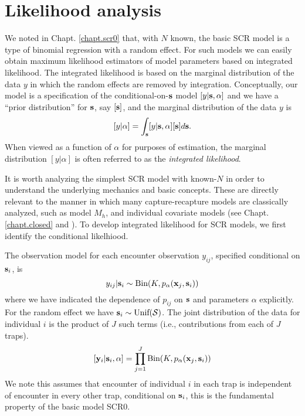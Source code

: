 \section{Likelihood analysis }

We noted in Chapt. \ref{chapt.scr0} that, with $N$ known, the basic SCR model is a
type of binomial regression with a random effect. For such models we
can easily obtain maximum likelihood estimators of model parameters
based on integrated likelihood. The integrated likelihood is based on
the marginal distribution of the data $y$ in which the random effects
are removed by integration. Conceptually, our model is a specification
of the conditional-on-${\bf s}$ model $[y|{\bf s},\alpha]$ and we have
a ``prior distribution'' for ${\bf s}$, say $[{\bf s}]$, and the
marginal distribution of the data $y$ is
\[
[y|\alpha] =  \int_{\bf s} [y|{\bf s},\alpha][{\bf s}] d{\bf s}.
\]
When viewed as a function of $\alpha$ for purposes of estimation, the
marginal distribution $[y|\alpha]$ is often referred to as the {\it
  integrated likelihood}.

It is worth analyzing 
the simplest SCR model with known-$N$ in order to understand the
underlying mechanics and basic concepts. These are directly relevant to
the manner in which many capture-recapture models are classically
analyzed, such as model $M_h$, and individual covariate models (see
Chapt. \ref{chapt.closed} and  \citet[][chapt. 6]{royle_dorazio:2008}). To develop integrated
likelihood for SCR models, we first identify the conditional
likelhiood. 

The observation model for each encounter observation $y_{ij}$,
specified conditional on ${\bf s}_{i}$, is 
\begin{equation}
y_{ij}| {\bf s}_{i} \sim \mbox{Bin}(K, p_{\alpha}({\bf x}_{j},{\bf s}_{i}))
\label{mle.eq.cond-on-s}
\end{equation}
where we have indicated the dependence of $p_{ij}$ on ${\bf s}$ and
parameters $\alpha$
explicitly.
For the random effect we have ${\bf s}_{i} \sim  \mbox{Unif}({\cal
  S})$.
The joint distribution of the data for individual $i$ is the product
of $J$ such terms (i.e., contributions from each of $J$ traps).
\[
  [{\bf y}_{i} | {\bf s}_{i} , \alpha] = 
  \prod_{j=1}^{J} \mbox{Bin}(K, p_{\alpha}({\bf x}_{j},{\bf s}_{i}) )
\]
We note this assumes that encounter of individual $i$ in each
trap is independent of encounter in every other trap, conditional on
${\bf s}_{i}$, this is the fundamental property of the basic model SCR0.



